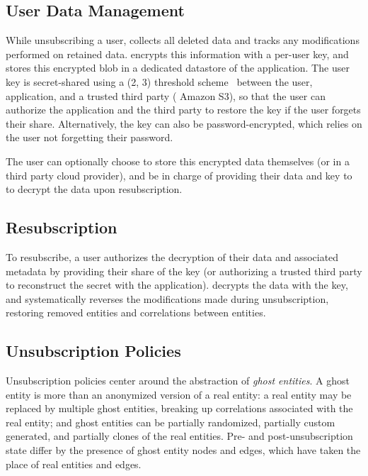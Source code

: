 \subsection{User Data Management}
\label{sec:design:storage}
While unsubscribing a user, \proto collects all deleted data and tracks any modifications performed
on retained data.  \proto encrypts this information with a per-user key, and stores this encrypted
blob in a dedicated datastore of the application. The user key is secret-shared using a (2, 3)
threshold scheme~\cite{secretsharing} between the user, application, and a trusted third party (\eg
Amazon S3), so that the user can authorize the application and the third party to restore the key if
the user forgets their share.  Alternatively, the key can also be password-encrypted, which relies
on the user not forgetting their password.

The user can optionally choose to store this encrypted data themselves (or in a third party cloud
provider), and be in charge of providing their data and key to \proto to decrypt the data upon
resubscription.

\subsection{Resubscription}
To resubscribe, a user authorizes the decryption of their data and associated metadata by
providing their share of the key (or authorizing a trusted third party to reconstruct the secret
with the application). \proto decrypts the data with the key, and systematically reverses 
the modifications made during unsubscription, restoring removed entities and correlations between
entities.

\subsection{Unsubscription Policies}
\label{sec:design:unsub}

Unsubscription policies center around the abstraction of \emph{ghost entities}. A ghost entity is
more than an anonymized version of a real entity: a real entity may be replaced by multiple ghost
entities, breaking up correlations associated with the real entity; and ghost entities can be
partially randomized, partially custom generated, and partially clones of the real entities.
Pre- and post-unsubscription state differ by the presence of ghost entity nodes and edges, which
have taken the place of real entities and edges. 

